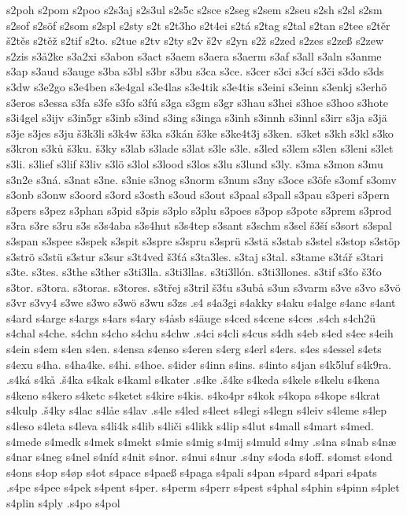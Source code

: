 {{s2poh
s2pom
s2poo
s2s3aj
s2s3ul
s2s5c
s2sce
s2seg
s2sem
s2seu
s2sh
s2sl
s2sm
s2sof
s2söf
s2som
s2spl
s2sty
s2t
s2t3ho
s2t4ei
s2tá
s2tag
s2tal
s2tan
s2tee
s2těr
š2těs
s2těž
s2tif
s2to.
s2tue
s2tv
s2ty
s2v
š2v
s2yn
s2ž
s2zed
s2zes
s2zeß
s2zew
s2zis
s3å2ke
s3a2xi
s3abon
s3act
s3aem
s3aera
s3aerm
s3af
s3all
s3aln
s3anme
s3ap
s3aud
s3auge
s3ba
s3bl
s3br
s3bu
s3ca
s3ce.
s3cer
s3ci
s3cí
s3či
s3do
s3ds
s3dw
s3e2go
s3e4ben
s3e4gal
s3e4las
s3e4tik
s3e4tis
s3eini
s3einn
s3enkj
s3erhö
s3eros
s3essa
s3fa
s3fe
s3fo
s3fú
s3ga
s3gm
s3gr
s3hau
s3hei
s3hoe
s3hoo
s3hote
s3i4gel
s3ijv
s3in5gr
s3inb
s3ind
s3ing
s3inga
s3inh
s3innh
s3innl
s3irr
s3ja
s3jä
s3je
s3jes
s3ju
š3k3li
s3k4w
š3ka
s3kán
š3ke
s3ke4t3j
s3ken.
s3ket
s3kh
s3kl
s3ko
s3kron
s3ků
š3ku.
š3ky
s3lab
s3lade
s3lat
s3le
s3le.
s3led
s3lem
s3len
s3leni
s3let
s3li.
s3lief
s3lif
š3liv
s3lö
s3lol
s3lood
s3los
s3lu
s3lund
s3ly.
s3ma
s3mon
s3mu
s3n2e
s3ná.
s3nat
s3ne.
s3nie
s3nog
s3norm
s3num
s3ny
s3oce
s3öfe
s3omf
s3omv
s3onb
s3onw
s3oord
s3ord
s3osth
s3oud
s3out
s3paal
s3pall
s3pau
s3peri
s3pern
s3pers
s3pez
s3phan
s3pid
s3pis
s3plo
s3plu
s3poes
s3pop
s3pote
s3prem
s3prod
s3ra
s3re
s3ru
s3s
s3s4aba
s3s4hut
s3s4tep
s3sant
s3schm
s3sel
š3ší
s3sort
s3spal
s3span
s3spee
s3spek
s3spit
s3spre
s3spru
s3sprü
s3stä
s3stab
s3stel
s3stop
s3stöp
s3strö
s3stü
s3stur
s3sur
s3t4ved
š3ťá
s3ta3les.
s3taj
s3tal.
s3tame
s3tář
s3tari
s3te.
s3tes.
s3the
s3ther
s3ti3lla.
s3ti3llas.
s3ti3llón.
s3ti3llones.
s3tif
s3ťo
š3ťo
s3tor.
s3tora.
s3toras.
s3tores.
s3třej
s3tril
š3ťu
s3ubå
s3un
s3varm
s3ve
s3vo
s3vö
s3vr
s3vy4
s3we
s3wo
s3wö
s3wu
s3zs
.s4
s4a3gi
s4akky
s4aku
s4alge
s4anc
s4ant
s4ard
s4arge
s4args
s4ars
s4ary
s4åsb
s4äuge
s4ced
s4cene
s4ces
.s4ch
s4ch2ü
s4chal
s4che.
s4chn
s4cho
s4chu
s4chw
.s4ci
s4cli
s4cus
s4dh
s4eb
s4ed
s4ee
s4eih
s4ein
s4em
s4en
s4en.
s4ensa
s4enso
s4eren
s4erg
s4erl
s4ers.
s4es
s4essel
s4ets
s4exu
s4ha.
s4ha4ke.
s4hi.
s4hoe.
s4ider
s4inn
s4ins.
s4into
s4jan
s4k5luf
s4k9ra.
.s4ká
s4kå
.š4ka
s4kak
s4kaml
s4kater
.s4ke
.š4ke
s4keda
s4kele
s4kelu
s4kena
s4keno
s4kero
s4ketc
s4ketet
s4kire
s4kis.
s4ko4pr
s4kok
s4kopa
s4kope
s4krat
s4kulp
.š4ky
s4lac
s4låe
s4lav
.s4le
s4led
s4leet
s4legi
s4legn
s4leiv
s4leme
s4lep
s4leso
s4leta
s4leva
s4li4k
s4lib
s4liči
s4likk
s4lip
s4lut
s4mall
s4mart
s4med.
s4mede
s4medk
s4mek
s4mekt
s4mie
s4mig
s4mij
s4muld
s4my
.s4na
s4nab
s4næ
s4nar
s4neg
s4nel
s4níd
s4nit
s4nor.
s4nui
s4nur
.s4ny
s4oda
s4off.
s4omst
s4ond
s4ons
s4op
s4øp
s4ot
s4pace
s4paeß
s4paga
s4pali
s4pan
s4pard
s4pari
s4pats
.s4pe
s4pee
s4pek
s4pent
s4per.
s4perm
s4perr
s4pest
s4phal
s4phin
s4pinn
s4plet
s4plin
s4ply
.s4po
s4pol
}}
